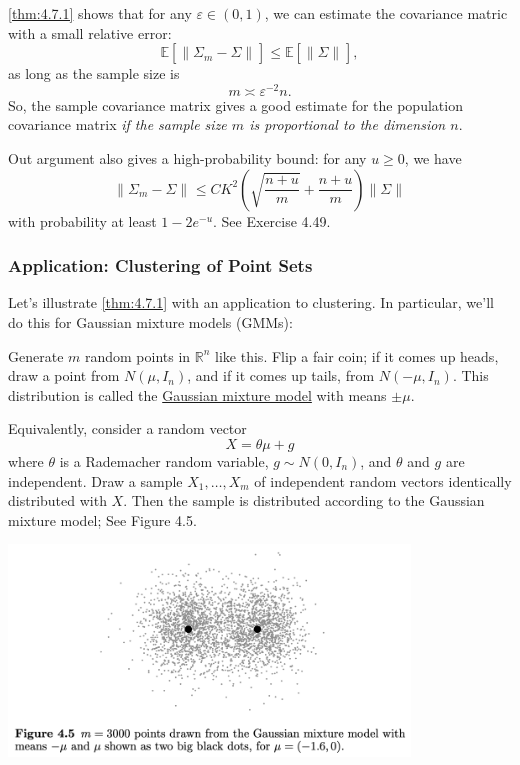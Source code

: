 \begin{remark}
\label{rmk:4.7.2}
\cref{thm:4.7.1} shows that for any $\varepsilon \in (0, 1)$, we can estimate the covariance matric with a 
small relative error:
\[ \mathbb{E}\left[ \lVert \Sigma_m - \Sigma \rVert_{} \right] \leq \mathbb{E}\left[ \lVert \Sigma
\rVert_{} \right], \]
as long as the sample size is 
\[ m \asymp \varepsilon^{-2}n. \]
So, the sample covariance matrix gives a good estimate for the population covariance matrix \textit{if the 
sample size $m$ is proportional to the dimension $n$}.
\end{remark}

\begin{remark}
\label{rmk:4.7.3}
Out argument also gives a high-probability bound: for any $u \geq 0$, we have 
\[ \lVert \Sigma_m - \Sigma \rVert_{} \leq 
CK^2 \left( \sqrt{\frac{n + u}{m}} + \frac{n + u}{m} \right) \lVert \Sigma \rVert_{} \]
with probability at least $1 - 2e^{-u}$. See Exercise 4.49.
\end{remark}


\subsubsection{Application: Clustering of Point Sets}
Let's illustrate \cref{thm:4.7.1} with an application to clustering. In particular, we'll do this for Gaussian 
mixture models (GMMs):

\begin{definition}[]
\label{def:4.7.4}
Generate $m$ random points in $\mathbb{R}^n$ like this. Flip a fair coin; if it comes up heads, draw a point 
from $N(\mu, I_n)$, and if it comes up tails, from $N(-\mu, I_n)$. This distribution is called the 
\underline{Gaussian mixture model} with means $\pm \mu$.
\end{definition}

Equivalently, consider a random vector 
\[ X = \theta \mu + g \]
where $\theta$ is a Rademacher random variable, $g \sim N(0, I_n)$, and $\theta$ and $g$ are independent. 
Draw a sample $X_1, \dots, X_m$ of independent random vectors identically distributed with $X$. Then the sample 
is distributed according to the Gaussian mixture model; See Figure 4.5.

\begin{center}
	\includegraphics[width=0.8\textwidth]{Chapter 4/fig4-5.png}
\end{center}

